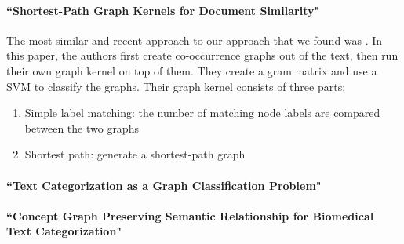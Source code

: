 \paragraph{``Shortest-Path Graph Kernels for Document Similarity" \cite{Nikolentzos2017a}}
The most similar and recent approach to our approach that we found was \cite{Nikolentzos2017a}. In this paper, the authors first create co-occurrence graphs out of the text, then run their own graph kernel on top of them. They create a gram matrix and use a SVM to classify the graphs. Their graph kernel consists of three parts:
\begin{enumerate}
\item{Simple label matching: the number of matching node labels are compared between the two graphs}
\item{Shortest path: generate a shortest-path graph}
\end{enumerate}

\paragraph{``Text Categorization as a Graph Classification Problem" \cite{Rousseau2015a}}


\paragraph{``Concept Graph Preserving Semantic Relationship for Biomedical Text Categorization" \cite{Gulrandhe2015}}